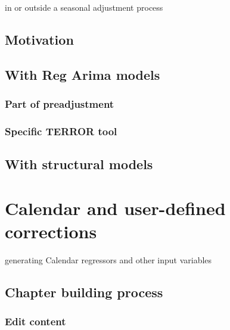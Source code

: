\documentclass[
  letterpaper,
  DIV=11,
  numbers=noendperiod]{scrreprt}
\begin{document}
in or outside a seasonal adjustment process

\hypertarget{motivation-1}{%
\section{Motivation}\label{motivation-1}}

\hypertarget{with-reg-arima-models}{%
\section{With Reg Arima models}\label{with-reg-arima-models}}

\hypertarget{part-of-preadjustment}{%
\subsection{Part of preadjustment}\label{part-of-preadjustment}}

\hypertarget{specific-terror-tool}{%
\subsection{Specific TERROR tool}\label{specific-terror-tool}}

\hypertarget{with-structural-models}{%
\section{With structural models}\label{with-structural-models}}

\hypertarget{calendar-and-user-defined-corrections}{%
\chapter{Calendar and user-defined
corrections}\label{calendar-and-user-defined-corrections}}

generating Calendar regressors and other input variables

\hypertarget{chapter-building-process-1}{%
\section{Chapter building process}\label{chapter-building-process-1}}

\hypertarget{edit-content-1}{%
\subsection{Edit content}\label{edit-content-1}}
\end{document}
